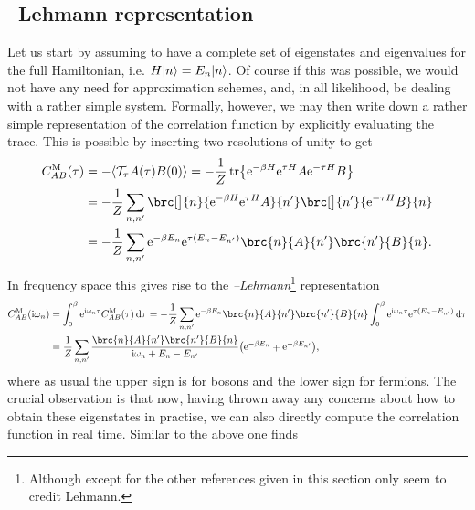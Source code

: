 \subsection{\nameKallen--Lehmann representation}\label{sec:gf:Kallen_Lehmann}
Let us start by assuming to have a complete set of eigenstates and eigenvalues for the full Hamiltonian, i.e. $H\Ket{n} = E_n \Ket{n}$.
Of course if this was possible, we would not have any need for approximation schemes, and, in all likelihood, be dealing with a rather simple system.
Formally, however, we may then write down a rather simple representation of the correlation function by explicitly evaluating the trace.
This is possible by inserting two resolutions of unity to get \cite[]{QMB_Bruus_2004}
\begin{align*}
C^\M_{AB}(\tau) &= -\bra*{\mathcal{T}_\tau A(\tau) B(0)} = -\frac{1}{Z} \tr \klc*{\powe{-\beta H} \powe{\tau H} A \powe{-\tau H} B}\\
&= -\frac{1}{Z} \sum_{n,n'} \brc[\big]{n}{ \powe{-\beta H} \powe{\tau H} A }{n'} \brc[\big]{n'}{ \powe{-\tau H} B}{n}\\
&= -\frac{1}{Z} \sum_{n,n'} \powe{-\beta E_n} \powe{\tau (E_n - E_{n'})} \brc{n}{A}{n'} \brc{n'}{B}{n}.
\end{align*}
In frequency space this gives rise to the \emph{\nameKallen--Lehmann}\footnote{Although except for \cite{QMB_Coleman_2015} the other references given in this section only seem to credit Lehmann.} representation \cite[]{QMB_Bruus_2004}
\begin{align*}
C^\M_{AB}(\i\omega_n) &= \intx{0}{\beta}{\powe{\i\omega_n\tau} C^\M_{AB}(\tau) }{\tau} = -\frac{1}{Z} \sum_{n,n'} \powe{-\beta E_n} \brc{n}{A}{n'} \brc{n'}{B}{n} \intx{0}{\beta}{\powe{\i\omega_n\tau} \powe{\tau (E_n - E_{n'})} }{\tau}\\
&= \frac{1}{Z} \sum_{n,n'} \frac{\brc{n}{A}{n'} \brc{n'}{B}{n}}{\i\omega_n + E_n - E_{n'}} \kla*{\powe{-\beta E_n} \mp  \powe{-\beta E_{n'}}},
\end{align*}
where as usual the upper sign is for bosons and the lower sign for fermions.
The crucial observation is that now, having thrown away any concerns about how to obtain these eigenstates in practise, we can also directly compute the correlation function in real time.
Similar to the above one finds  \cite[]{QMB_Bruus_2004}
